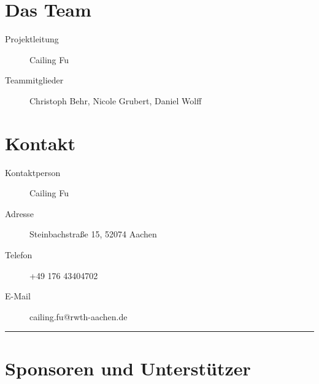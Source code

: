 \documentclass[a4paper,12pt,notumble]{leaflet}
\begin{document}
\newpage

\section{Das Team}
\begin{description}
\item[Projektleitung] Cailing Fu
\item[Teammitglieder] Christoph Behr, Nicole Grubert, Daniel Wolff

\end{description}

\section{Kontakt}
\begin{description}
\item[Kontaktperson] Cailing Fu 
\item[Adresse] Steinbachstraße 15, 52074 Aachen
\item[Telefon] +49 176 43404702
\item[E-Mail] cailing.fu@rwth-aachen.de
\end{description}

\textcolor{rwth-lblue}{\noindent\rule{\textwidth}{4pt}}

\section{Sponsoren und Unterstützer}
\end{document}
